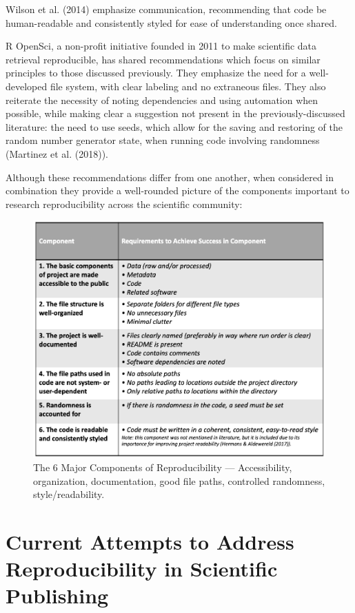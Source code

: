 \documentclass[12pt,twoside]{reedthesis}
\begin{document}
Wilson et al. (2014) emphasize communication, recommending that code be human-readable and consistently styled for ease of understanding once shared.

R OpenSci, a non-profit initiative founded in 2011 to make scientific data retrieval reproducible, has shared recommendations which focus on similar principles to those discussed previously. They emphasize the need for a well-developed file system, with clear labeling and no extraneous files. They also reiterate the necessity of noting dependencies and using automation when possible, while making clear a suggestion not present in the previously-discussed literature: the need to use seeds, which allow for the saving and restoring of the random number generator state, when running code involving randomness (Martinez et al. (2018)).

Although these recommendations differ from one another, when considered in combination they provide a well-rounded picture of the components important to research reproducibility across the scientific community:
\begin{figure}
\includegraphics[width=1\linewidth]{figure/6-components} \caption{The 6 Major Components of Reproducibility --- Accessibility, organization, documentation, good file paths, controlled randomness, style/readability.}\label{fig:unnamed-chunk-4}
\end{figure}
\hypertarget{current-attempts-to-address-reproducibility-in-scientific-publishing}{%
\section{Current Attempts to Address Reproducibility in Scientific Publishing}\label{current-attempts-to-address-reproducibility-in-scientific-publishing}}
\end{document}
